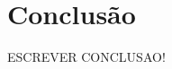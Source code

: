 \documentclass[12pt]{article}
\begin{document}
\newpage

\section{Conclusão} 

ESCREVER CONCLUSAO! 


\end{document}
